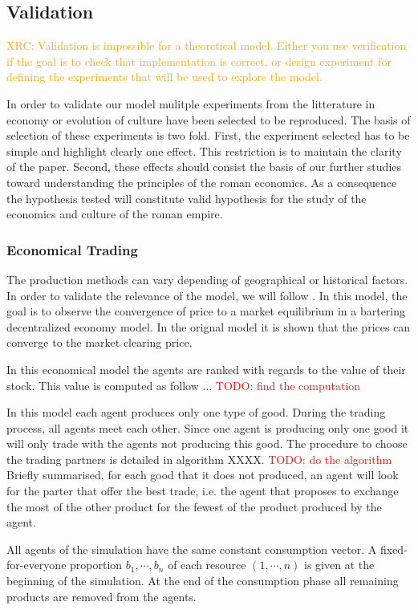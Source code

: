 \documentclass{wscpaperproc}
\newcommand{\memo}[2]{\textcolor{#1}{#2}}
\newcommand{\todo}[1]{\memo{red}{TODO: #1\\}}
\newcommand{\xrc}[1]{\memo{orange}{XRC: #1\\}}
\begin{document}
\subsection{Validation}
\xrc{Validation is impossible for a theoretical model. Either you use verification if the goal is to check that implementation is correct, or design experiment for defining the experiments that will be used to explore the model.}

In order to validate our model mulitple experiments from the litterature in economy or evolution of culture have been selected to be reproduced. The basis of selection of these experiments is two fold. First, the experiment selected has to be simple and highlight clearly one effect. This restriction is to maintain the clarity of the paper. Second, these effects should consist the basis of our further studies toward understanding the principles of the roman economics. As a consequence the hypothesis tested will constitute valid hypothesis for the study of the economics and culture of the roman empire.

\subsubsection{Economical Trading}\label{trade}

The production methods can vary depending of geographical or historical factors. In order to validate the relevance of the model, we will follow \cite{gintis_emergence_2006}. In this model, the goal is to observe the convergence of price to a market equilibrium in a bartering decentralized economy model. In the orignal model it is shown that the prices can converge to the market clearing price.

In this economical model the agents are ranked with regards to the value of their stock. This value is computed as follow ...
\todo{find the computation}

In this model each agent produces only one type of good. During the trading process, all agents meet each other. Since one agent is producing only one good it will only trade with the agents not producing this good. The procedure to choose the trading partners is detailed in algorithm XXXX.
\todo{do the algorithm}
Briefly summarised, for each good that it does not produced, an agent will look for the parter that offer the best trade, i.e. the agent that proposes to exchange the most of the other product for the fewest of the product produced by the agent.

All agents of the simulation have the same constant consumption vector. A fixed-for-everyone proportion $b_1,\cdots,b_n$ of each resource $(1, \cdots, n)$ is given at the beginning of the simulation. At the end of the consumption phase all remaining products are removed from the agents.
\end{document}
